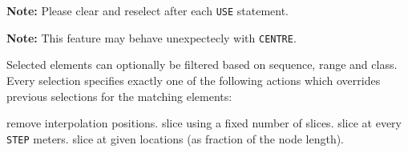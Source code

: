 
\textbf{Note:} Please clear and reselect after each \texttt{USE} statement.

\textbf{Note:} This feature may behave unexpectecly with \texttt{CENTRE}.

Selected elements can optionally be filtered based on sequence, range and
class. Every selection specifies exactly one of the following actions which
overrides previous selections for the matching elements:

\begin{madlist}
   remove interpolation positions.
   slice using a fixed number of slices.
   slice at every \texttt{STEP} meters.
   slice at given locations (as fraction of the node length).
\end{madlist}


